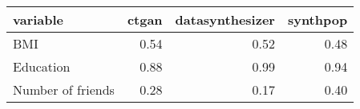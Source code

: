 \begin{tabular}{lrrr}
  \toprule
variable & ctgan & datasynthesizer & synthpop \\ 
  \midrule
BMI & 0.54 & 0.52 & 0.48 \\ 
  Education & 0.88 & 0.99 & 0.94 \\ 
  Number of friends & 0.28 & 0.17 & 0.40 \\ 
   \bottomrule
\end{tabular}
